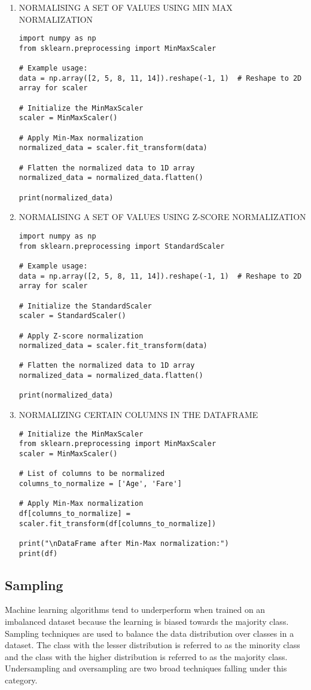 \documentclass[11pt]{article}
\begin{document}
\begin{enumerate}
\item NORMALISING A SET OF VALUES USING MIN MAX NORMALIZATION
\label{sec:org9a5cfe1}
\begin{verbatim}
import numpy as np
from sklearn.preprocessing import MinMaxScaler

# Example usage:
data = np.array([2, 5, 8, 11, 14]).reshape(-1, 1)  # Reshape to 2D array for scaler

# Initialize the MinMaxScaler
scaler = MinMaxScaler()

# Apply Min-Max normalization
normalized_data = scaler.fit_transform(data)

# Flatten the normalized data to 1D array
normalized_data = normalized_data.flatten()

print(normalized_data)
\end{verbatim}
\item NORMALISING A SET OF VALUES USING Z-SCORE NORMALIZATION
\label{sec:org5c4e9a7}
\begin{verbatim}
import numpy as np
from sklearn.preprocessing import StandardScaler

# Example usage:
data = np.array([2, 5, 8, 11, 14]).reshape(-1, 1)  # Reshape to 2D array for scaler

# Initialize the StandardScaler
scaler = StandardScaler()

# Apply Z-score normalization
normalized_data = scaler.fit_transform(data)

# Flatten the normalized data to 1D array
normalized_data = normalized_data.flatten()

print(normalized_data)
\end{verbatim}
\item NORMALIZING CERTAIN COLUMNS IN THE DATAFRAME
\label{sec:orgfadd2fb}
\begin{verbatim}
# Initialize the MinMaxScaler
from sklearn.preprocessing import MinMaxScaler
scaler = MinMaxScaler()

# List of columns to be normalized
columns_to_normalize = ['Age', 'Fare']

# Apply Min-Max normalization
df[columns_to_normalize] = scaler.fit_transform(df[columns_to_normalize])

print("\nDataFrame after Min-Max normalization:")
print(df)
\end{verbatim}
\end{enumerate}
\subsection{Sampling}
\label{sec:org978da81}
Machine learning algorithms tend to underperform when trained on an imbalanced dataset because the learning is biased towards the majority class.
Sampling techniques are used to balance the data distribution over classes in a dataset. The class with the lesser distribution is referred to as the minority class and the class with the higher distribution is referred to as the majority class. Undersampling and oversampling are two broad techniques falling under this category.
\end{document}
